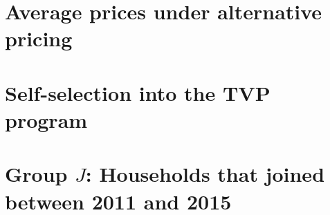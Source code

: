 \documentclass[12pt]{article}
\begin{document}
\clearpage




%
% 
%

\begin{appendices}

  \startcontents[sections]

  \clearpage

\renewcommand\thefigure{\thesection.\arabic{figure}}

\section{Average prices under alternative pricing}

  \setcounter{figure}{0}

  \label{appendix:appendix_marschak}

  

\clearpage


\section{Self-selection into the TVP program}

  \setcounter{figure}{0}

  \label{appendix:appendix_selfSelection}

  

\clearpage

\section{Group $J$: Households that joined between 2011 and 2015}

  \setcounter{figure}{0}

  \label{appendix:appendix_groupJ}


\end{appendices}
\end{document}
